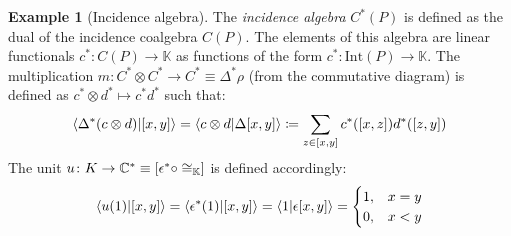 \documentclass[svgnames]{article}
\theoremstyle{definition}
\newtheorem*{Example*}{Example}
\theoremstyle{remark}
\theoremstyle{underline}
\theoremstyle{underline}
\begin{document}
 	\begin{Example*}[Incidence algebra]
 		The \emph{incidence algebra} $C^*(P)$ is defined as the dual of the incidence coalgebra $C(P)$. The elements of this algebra are linear functionals $c^* \colon C(P) \to \mathbb K$ as functions of the form $c^* \colon \mathrm{Int}(P) \to \mathbb K$. The multiplication $m \colon C^* \otimes C^* \to C^* \equiv \Delta^* \rho$ (from the commutative diagram) is defined as $c^* \otimes d^* \mapsto c^* d^*$ such that:
 		\begin{gather*}
 			\braket{\Delta^*\pqty{c \otimes d}}{[x,y]} = \braket{c \otimes d}{\Delta[x,y]} \coloneqq \sum_{z \in [x,y]} c^*\pqty{[x,z]}d^*\pqty{[z,y]}
 		\end{gather*}
 		The unit $u \colon K \to \mathbb C^* \equiv \bqty{\epsilon^* \circ \cong_{\mathbb K}}$ is defined accordingly:
 		\begin{gather*}
 			\braket{u(1)}{[x,y]} = \braket{\epsilon^*(1)}{[x,y]} = \braket{1}{\epsilon[x,y]} =
 			\begin{cases}
 				1, & x = y \\
 				0, & x < y
 			\end{cases}
 		\end{gather*}
 	\end{Example*}
 	
\end{document}
